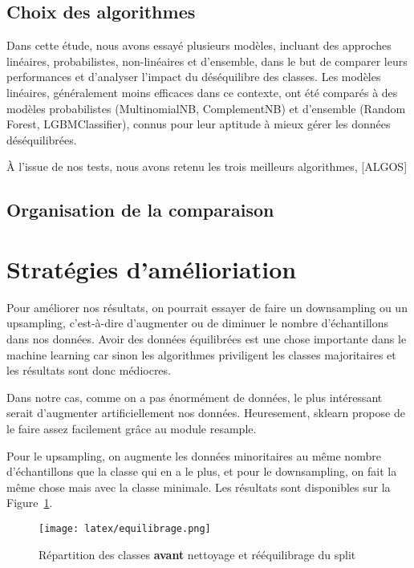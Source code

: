 \documentclass[11pt]{article}
\begin{document}
\subsection{Choix des algorithmes}
Dans cette étude, nous avons essayé plusieurs modèles, incluant des approches linéaires, probabilistes, non-linéaires et d'ensemble, dans le but de comparer leurs performances et d'analyser l'impact du déséquilibre des classes. Les modèles linéaires, généralement moins efficaces dans ce contexte, ont été comparés à des modèles probabilistes (MultinomialNB, ComplementNB) et d'ensemble (Random Forest, LGBMClassifier), connus pour leur aptitude à mieux gérer les données déséquilibrées.

À l'issue de nos tests, nous avons retenu les trois meilleurs algorithmes, [ALGOS]

\subsection{Organisation de la comparaison}

\section{Stratégies d'amélioriation}
Pour améliorer nos résultats, on pourrait essayer de faire un downsampling ou un upsampling, c'est-à-dire d'augmenter ou de diminuer le nombre d'échantillons dans nos données. Avoir des données équilibrées est une chose importante dans le machine learning car sinon les algorithmes priviligent les classes majoritaires et les résultats sont donc médiocres.

Dans notre cas, comme on a pas énormément de données, le plus intéressant serait d'augmenter artificiellement nos données. Heuresement, sklearn propose de le faire assez facilement grâce au module resample.

Pour le upsampling, on augmente les données minoritaires au même nombre d'échantillons que la classe qui en a le plus, et pour le downsampling, on fait la même chose mais avec la classe minimale. Les résultats sont disponibles sur la Figure~\ref{fig:equilibrage}.

\begin{figure}[H]
  \texttt{[image: latex/equilibrage.png]}
  \caption{Répartition des classes \textbf{avant} nettoyage et rééquilibrage du split}
  \label{fig:equilibrage} %
\end{figure}
\end{document}
